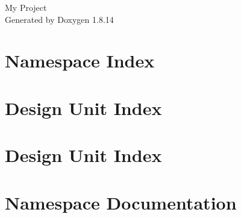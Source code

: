 \documentclass[twoside]{book}
\newcommand{\+}{\discretionary{\mbox{\scriptsize$\hookleftarrow$}}{}{}}
\newcommand{\clearemptydoublepage}{%
  \newpage{\pagestyle{empty}\cleardoublepage}%
}
\begin{document}
\hypersetup{pageanchor=false,
             bookmarksnumbered=true,
             pdfencoding=unicode
            }
\begin{titlepage}
\vspace*{7cm}
\begin{center}%
{\Large My Project }\\
\vspace*{1cm}
{\large Generated by Doxygen 1.8.14}\\
\end{center}
\end{titlepage}
\clearemptydoublepage
{}
\tableofcontents
\clearemptydoublepage
{}
\hypersetup{pageanchor=true}

\chapter{Namespace Index}

\chapter{Design Unit Index}

\chapter{Design Unit Index}

\chapter{Namespace Documentation}





\end{document}
